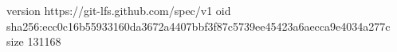 version https://git-lfs.github.com/spec/v1
oid sha256:ecc0c16b55933160da3672a4407bbf3f87c5739ee45423a6aecca9e4034a277c
size 131168
